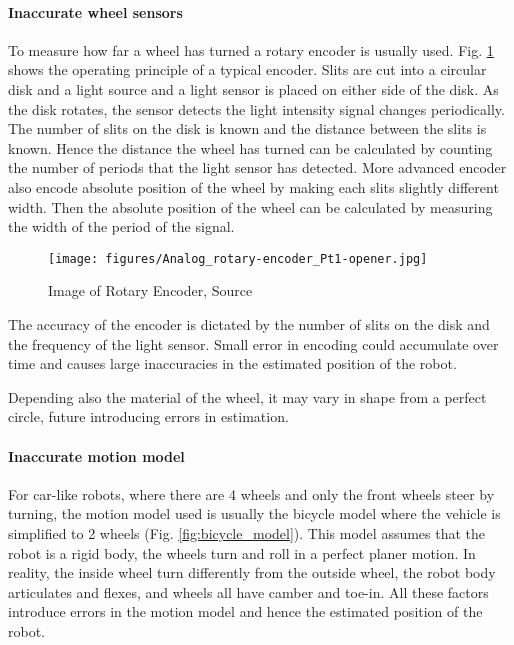 \documentclass{report}
\begin{document}
\paragraph*{Inaccurate wheel sensors}

To measure how far a wheel has turned a rotary encoder is usually used. Fig. \ref*{fig:rotary_encoder} shows the operating principle of a typical encoder. Slits are cut into a circular disk and a light source and a light sensor is placed on either side of the disk. As the disk rotates, the sensor detects the light intensity signal changes periodically. The number of slits on the disk is known and the distance between the slits is known. Hence the distance the wheel has turned can be calculated by counting the number of periods that the light sensor has detected. More advanced encoder also encode absolute position of the wheel by making each slits slightly different width. Then the absolute position of the wheel can be calculated by measuring the width of the period of the signal.

\begin{figure}[h]
    \centering
    \texttt{[image: figures/Analog\_rotary-encoder\_Pt1-opener.jpg]}
    \caption{Image of Rotary Encoder, Source \cite{schweberRotaryEncoderBasics2018}}
    \label{fig:rotary_encoder}
\end{figure}

The accuracy of the encoder is dictated by the number of slits on the disk and the frequency of the light sensor. Small error in encoding could accumulate over time and causes large inaccuracies in the estimated position of the robot.

Depending also the material of the wheel, it may vary in shape from a perfect circle, future introducing errors in estimation.

\paragraph*{Inaccurate motion model}

For car-like robots, where there are 4 wheels and only the front wheels steer by turning, the motion model used is usually the bicycle model where the vehicle is simplified to 2 wheels (Fig. \ref*{fig:bicycle_model}). This model assumes that the robot is a rigid body, the wheels turn and roll in a perfect planer motion. In reality, the inside wheel turn differently from the outside wheel, the robot body articulates and flexes, and wheels all have camber and toe-in. All these factors introduce errors in the motion model and hence the estimated position of the robot.
\end{document}
